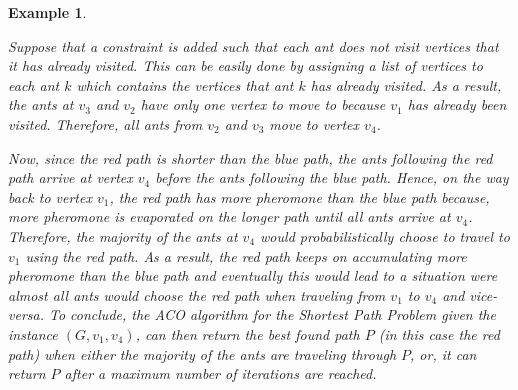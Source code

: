 \documentclass[12pt]{article}
\newtheorem{example}[definition]{Example}
\numberwithin{equation}{subsection}
\numberwithin{table}{subsection}
\numberwithin{algorithm}{subsection}
\numberwithin{figure}{subsection}
\begin{document}
\begin{example}
\begin{center}
\end{center}
Suppose that a constraint is added such that each ant does not visit vertices that it has already visited. This can be easily done by assigning a list of vertices to each ant $k$ which contains the vertices that ant $k$ has already visited. As a result, the ants at $v_3$ and $v_2$ have only one vertex to move to because $v_1$ has already been visited. Therefore, all ants from $v_2$ and $v_3$ move to vertex $v_4$.
\begin{center}
\end{center}
Now, since the red path is shorter than the blue path, the ants following the red path arrive at vertex $v_4$ before the ants following the blue path. Hence, on the way back to vertex $v_1$, the red path has more pheromone than the blue path because, more pheromone is evaporated on the longer path until all ants arrive at $v_4$. Therefore, the majority of the ants at $v_4$ would probabilistically choose to travel to $v_1$ using the red path. As a result, the red path keeps on accumulating more pheromone than the blue path and eventually this would lead to a situation were almost all ants would choose the red path when traveling from $v_1$ to $v_4$ and vice-versa. To conclude, the ACO algorithm for the Shortest Path Problem given the instance $(G, v_1, v_4)$, can then return the best found path $P$ (in this case the red path) when either the majority of the ants are traveling through $P$, or, it can return $P$ after a maximum number of iterations are reached.  
\end{example}
\end{document}
